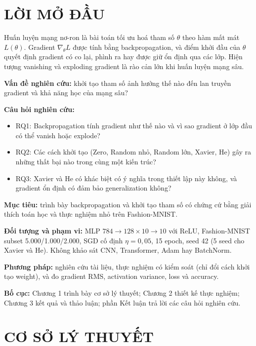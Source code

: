 \documentclass[12pt,a4paper]{report}
\begin{document}
\tableofcontents
\listoffigures
\listoftables

\chapter*{LỜI MỞ ĐẦU}

Huấn luyện mạng nơ-ron là bài toán tối ưu hoá tham số $\theta$ theo hàm mất mát $L(\theta)$. Gradient $\nabla_\theta L$ được tính bằng backpropagation, và điểm khởi đầu của $\theta$ quyết định gradient có co lại, phình ra hay được giữ ổn định qua các lớp. Hiện tượng vanishing và exploding gradient là rào cản lớn khi huấn luyện mạng sâu.

\textbf{Vấn đề nghiên cứu:} khởi tạo tham số ảnh hưởng thế nào đến lan truyền gradient và khả năng học của mạng sâu?

\textbf{Câu hỏi nghiên cứu:}
\begin{itemize}
  \item RQ1: Backpropagation tính gradient như thế nào và vì sao gradient ở lớp đầu có thể vanish hoặc explode?
  \item RQ2: Các cách khởi tạo (Zero, Random nhỏ, Random lớn, Xavier, He) gây ra những thất bại nào trong cùng một kiến trúc?
  \item RQ3: Xavier và He có khác biệt có ý nghĩa trong thiết lập này không, và gradient ổn định có đảm bảo generalization không?
\end{itemize}

\textbf{Mục tiêu:} trình bày backpropagation và khởi tạo tham số có chứng cứ bằng giải thích toán học và thực nghiệm nhỏ trên Fashion-MNIST.

\textbf{Đối tượng và phạm vi:} MLP $784\to128\times10\to10$ với ReLU, Fashion-MNIST subset 5.000/1.000/2.000, SGD cố định $\eta=0{,}05$, 15 epoch, seed 42 (5 seed cho Xavier và He). Không khảo sát CNN, Transformer, Adam hay BatchNorm.

\textbf{Phương pháp:} nghiên cứu tài liệu, thực nghiệm có kiểm soát (chỉ đổi cách khởi tạo weight), và đo gradient RMS, activation variance, loss và accuracy.

\textbf{Bố cục:} Chương 1 trình bày cơ sở lý thuyết; Chương 2 thiết kế thực nghiệm; Chương 3 kết quả và thảo luận; phần Kết luận trả lời các câu hỏi nghiên cứu.

\chapter{CƠ SỞ LÝ THUYẾT}
\end{document}
